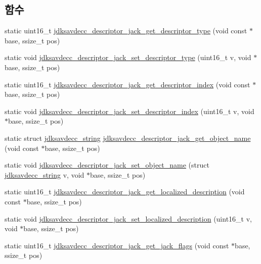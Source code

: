 \subsection*{함수}
\begin{DoxyCompactItemize}
\item 
static uint16\+\_\+t \hyperlink{group__descriptor__jack_ga651daa6c8ccf52cdd55b6fc68122b4c4}{jdksavdecc\+\_\+descriptor\+\_\+jack\+\_\+get\+\_\+descriptor\+\_\+type} (void const $\ast$base, ssize\+\_\+t pos)
\item 
static void \hyperlink{group__descriptor__jack_gaa126ded038d591375b4f4fe13c376b74}{jdksavdecc\+\_\+descriptor\+\_\+jack\+\_\+set\+\_\+descriptor\+\_\+type} (uint16\+\_\+t v, void $\ast$base, ssize\+\_\+t pos)
\item 
static uint16\+\_\+t \hyperlink{group__descriptor__jack_ga87120a7dafd647c7aa3f0903b8cf183a}{jdksavdecc\+\_\+descriptor\+\_\+jack\+\_\+get\+\_\+descriptor\+\_\+index} (void const $\ast$base, ssize\+\_\+t pos)
\item 
static void \hyperlink{group__descriptor__jack_gaf1dc5723e83126ed8adfa317b05e5452}{jdksavdecc\+\_\+descriptor\+\_\+jack\+\_\+set\+\_\+descriptor\+\_\+index} (uint16\+\_\+t v, void $\ast$base, ssize\+\_\+t pos)
\item 
static struct \hyperlink{structjdksavdecc__string}{jdksavdecc\+\_\+string} \hyperlink{group__descriptor__jack_ga414ebcccf6aab5daf1262d2375060509}{jdksavdecc\+\_\+descriptor\+\_\+jack\+\_\+get\+\_\+object\+\_\+name} (void const $\ast$base, ssize\+\_\+t pos)
\item 
static void \hyperlink{group__descriptor__jack_ga247a91866f4938403b92b73d468a6e5e}{jdksavdecc\+\_\+descriptor\+\_\+jack\+\_\+set\+\_\+object\+\_\+name} (struct \hyperlink{structjdksavdecc__string}{jdksavdecc\+\_\+string} v, void $\ast$base, ssize\+\_\+t pos)
\item 
static uint16\+\_\+t \hyperlink{group__descriptor__jack_gafe5ad1e08d6c98dec21c1a489fea3342}{jdksavdecc\+\_\+descriptor\+\_\+jack\+\_\+get\+\_\+localized\+\_\+description} (void const $\ast$base, ssize\+\_\+t pos)
\item 
static void \hyperlink{group__descriptor__jack_gabe6dec09b0a44d5b8cfe8dfb4ab0d33a}{jdksavdecc\+\_\+descriptor\+\_\+jack\+\_\+set\+\_\+localized\+\_\+description} (uint16\+\_\+t v, void $\ast$base, ssize\+\_\+t pos)
\item 
static uint16\+\_\+t \hyperlink{group__descriptor__jack_gad47529461dd0b81cd2d7273c8cc2c024}{jdksavdecc\+\_\+descriptor\+\_\+jack\+\_\+get\+\_\+jack\+\_\+flags} (void const $\ast$base, ssize\+\_\+t pos)

\end{DoxyCompactItemize}

